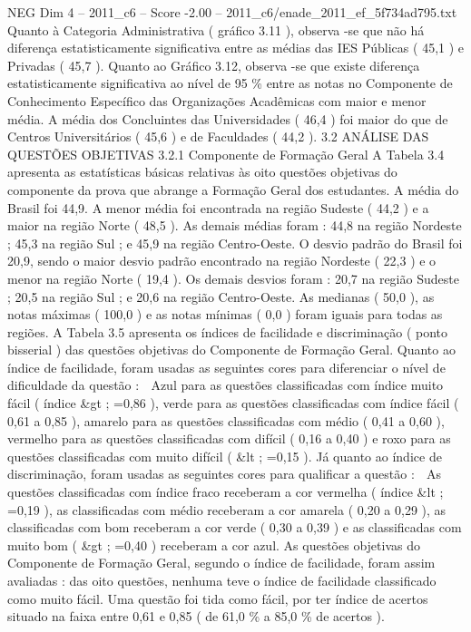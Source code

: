 \begin{textsample}{NEG Dim 4 – 2011\_c6 – Score -2.00 – 2011\_c6/enade\_2011\_ef\_5f734ad795.txt}
Quanto à Categoria Administrativa ( gráfico 3.11 ), observa -se que não há diferença estatisticamente significativa entre as médias das IES Públicas ( 45,1 ) e Privadas ( 45,7 ).
Quanto ao Gráfico 3.12, observa -se que existe diferença estatisticamente significativa ao nível de 95 \% entre as notas no Componente de Conhecimento Específico das Organizações Acadêmicas com maior e menor média.
A média dos Concluintes das Universidades ( 46,4 ) foi maior do que de Centros Universitários ( 45,6 ) e de Faculdades ( 44,2 ). 3.2 ANÁLISE DAS QUESTÕES OBJETIVAS 3.2.1 Componente de Formação Geral A Tabela 3.4 apresenta as estatísticas básicas relativas às oito questões objetivas do componente da prova que abrange a Formação Geral dos estudantes.
A média do Brasil foi 44,9.
A menor média foi encontrada na região Sudeste ( 44,2 ) e a maior na região Norte ( 48,5 ).
As demais médias foram : 44,8 na região Nordeste ; 45,3 na região Sul ; e 45,9 na região Centro-Oeste.
O desvio padrão do Brasil foi 20,9, sendo o maior desvio padrão encontrado na região Nordeste ( 22,3 ) e o menor na região Norte ( 19,4 ).
Os demais desvios foram : 20,7 na região Sudeste ; 20,5 na região Sul ; e 20,6 na região Centro-Oeste.
As medianas ( 50,0 ), as notas máximas ( 100,0 ) e as notas mínimas ( 0,0 ) foram iguais para todas as regiões.
A Tabela 3.5 apresenta os índices de facilidade e discriminação ( ponto bisserial ) das questões objetivas do Componente de Formação Geral.
Quanto ao índice de facilidade, foram usadas as seguintes cores para diferenciar o nível de dificuldade da questão :  Azul para as questões classificadas com índice muito fácil ( índice \&gt ; =0,86 ), verde para as questões classificadas com índice fácil ( 0,61 a 0,85 ), amarelo para as questões classificadas com médio ( 0,41 a 0,60 ), vermelho para as questões classificadas com difícil ( 0,16 a 0,40 ) e roxo para as questões classificadas com muito difícil ( \&lt ; =0,15 ).
Já quanto ao índice de discriminação, foram usadas as seguintes cores para qualificar a questão :  As questões classificadas com índice fraco receberam a cor vermelha ( índice \&lt ; =0,19 ), as classificadas com médio receberam a cor amarela ( 0,20 a 0,29 ), as classificadas com bom receberam a cor verde ( 0,30 a 0,39 ) e as classificadas com muito bom ( \&gt ; =0,40 ) receberam a cor azul.
As questões objetivas do Componente de Formação Geral, segundo o índice de facilidade, foram assim avaliadas : das oito questões, nenhuma teve o índice de facilidade classificado como muito fácil.
Uma questão foi tida como fácil, por ter índice de acertos situado na faixa entre 0,61 e 0,85 ( de 61,0 \% a 85,0 \% de acertos ).

\end{textsample}
